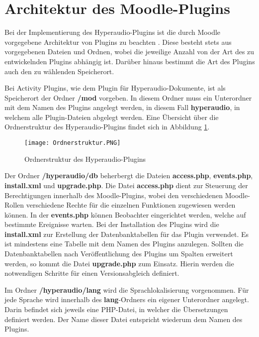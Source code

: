 
\section{Architektur des Moodle-Plugins}
\label{sec:architektur}
Bei der Implementierung des Hyperaudio-Plugins ist die durch Moodle vorgegebene Architektur von Plugins zu beachten \citep{moodle2016activity}. Diese besteht stets aus vorgegebenen Dateien und Ordnen, wobei die jeweilige Anzahl von der Art des zu entwickelnden Plugins abhängig ist. Darüber hinaus bestimmt die Art des Plugins auch den zu wählenden Speicherort.

Bei Activity Plugins, wie dem Plugin für Hyperaudio-Dokumente, ist als Speicherort der Ordner \textbf{/mod} vorgeben. In diesem Ordner muss ein Unterordner mit dem Namen des Plugins angelegt werden, in diesem Fall \textbf{hyperaudio}, in welchem alle Plugin-Dateien abgelegt werden. Eine Übersicht über die Ordnerstruktur des Hyperaudio-Plugins findet sich in Abbildung \ref{fig:Ordnerstruktur}.

\begin{figure}[h!]
\texttt{[image: Ordnerstruktur.PNG]}
\caption{\label{fig:Ordnerstruktur}Ordnerstruktur des Hyperaudio-Plugins}
\end{figure}


Der Ordner \textbf{/hyperaudio/db} beherbergt die Dateien \textbf{access.php}, \textbf{events.php}, \textbf{install.xml} und \textbf{upgrade.php}. Die Datei \textbf{access.php} dient zur Steuerung der Berechtigungen innerhalb des Moodle-Plugins, wobei den verschiedenen Moodle-Rollen verschiedene Rechte für die einzelnen Funktionen zugewiesen werden können. In der \textbf{events.php} können Beobachter eingerichtet werden, welche auf bestimmte Ereignisse warten. Bei der Installation des Plugins wird die \textbf{install.xml} zur Erstellung der Datenbanktabellen für das Plugin verwendet. Es ist mindestens eine Tabelle mit dem Namen des Plugins anzulegen. Sollten die Datenbanktabellen nach Veröffentlichung des Plugins um Spalten erweitert werden, so kommt die Datei \textbf{upgrade.php} zum Einsatz. Hierin werden die notwendigen Schritte für einen Versionsabgleich definiert.

Im Ordner \textbf{/hyperaudio/lang} wird die Sprachlokalisierung vorgenommen. Für jede Sprache wird innerhalb des \textbf{lang}-Ordners ein eigener Unterordner angelegt. Darin befindet sich jeweils eine PHP-Datei, in welcher die Übersetzungen definiert werden. Der Name dieser Datei entspricht wiederum dem Namen des Plugins.

